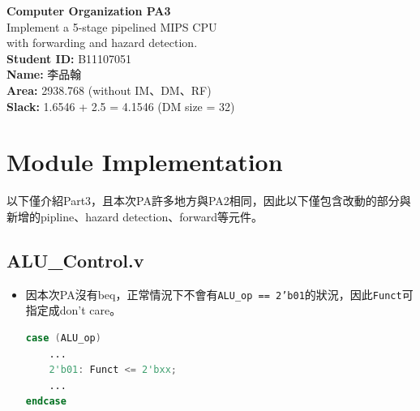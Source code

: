 \documentclass[12pt]{article}
\begin{document}
\begin{titlepage}
    \thispagestyle{empty}
    \vspace*{\fill} %
    \begin{center}
        \LARGE\textbf{Computer Organization PA3} \\[1.0em]
        \Large Implement a 5-stage pipelined MIPS CPU \\ with forwarding and hazard detection. \\[2.0em]
        \normalsize
        \textbf{Student ID:} B11107051 \\[0.5em]
        \textbf{Name:} 李品翰 \\[0.5em]
        \textbf{Area:} 2938.768 (without IM、DM、RF) \\
        \textbf{Slack:} 1.6546 + 2.5 = 4.1546 (DM size = 32) \\[2em]
    \end{center}
    \vspace*{\fill} %
\end{titlepage}


\section{Module Implementation}

以下僅介紹Part3，且本次PA許多地方與PA2相同，因此以下僅包含改動的部分與新增的pipline、hazard detection、forward等元件。

\subsection{ALU\_Control.v}
\begin{itemize}
    \item 因本次PA沒有beq，正常情況下不會有\texttt{ALU\_op == 2'b01}的狀況，因此\texttt{Funct}可指定成don't care。
    \begin{lstlisting}[language=Verilog]
case (ALU_op)
    ...
    2'b01: Funct <= 2'bxx;
    ...
endcase
    \end{lstlisting}
\end{itemize}
\end{document}
